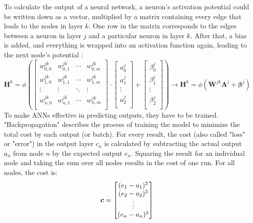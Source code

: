 To calculate the output of a neural network, a neuron's activation potential could be written down as a vector, multiplied by a matrix containing every edge that leads to the nodes in layer $k$. One row in the matrix corresponds to the edges between a neuron in layer $j$ and a particular neuron in layer $k$. After that, a bias is added, and everything is wrapped into an activation function again, leading to the next node's potential \cite{youtube3blue1brown} \cite{zhang2023dive}:
\begin{equation}
\label{eq:ann_forward_propergation}
\boldsymbol{H}^{k} = \phi \left(
\begin{bmatrix}
w^{jk}_{0,0} & w^{jk}_{0,1} & \cdots & w^{jk}_{0,m}\\
w^{jk}_{1,0} & w^{jk}_{1,1} & \cdots & w^{jk}_{1,m}\\
\vdots  & \vdots  & \ddots & \vdots \\
w^{jk}_{n,0} & w^{jk}_{n,1} & \cdots & w^{jk}_{n,m} \\
\end{bmatrix}
\cdot
\begin{bmatrix}
a_{0}^{j}\\
a_{1}^{j}\\
\vdots \\
a_{2}^{j}\\
\end{bmatrix}
+
\begin{bmatrix}
\beta_{0}^{j}\\
\beta_{1}^{j}\\
\vdots \\
\beta_{2}^{j}\\
\end{bmatrix}
\right) 
\xrightarrow{\text{}}
\boldsymbol{H}^{k} = \phi{(\boldsymbol{W}^{jk}\boldsymbol{A}^j + \boldsymbol{\beta}^j)}
\end{equation}
To make ANNs effective in predicting outputs, they have to be trained. "Backpropagation" describes the process of training the model to minimize the total cost by each output (or batch). For every result, the cost (also called "loss" or "error") in the output layer $c_n$ is calculated by subtracting the actual output $a_n$ from node $n$ by the expected output $e_n$. Squaring the result for an individual node and taking the sum over all nodes results in the cost of one run. For all nodes, the cost is:
\begin{equation}
\boldsymbol{c} = 
\begin{bmatrix}
(e_{1} - a_{1})^{2}\\
(e_{2} - a_{2})^{2}\\
\vdots \\
(e_{n} - a_{n})^{2}\\
\end{bmatrix}
\end{equation}

